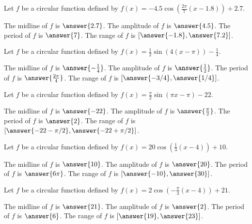 \documentclass{ximera}
\author{Kenneth Berglund}
\begin{document}
\begin{exercise}
Let $f$ be a circular function defined by $f(x) = -4.5 \cos\left(\frac{2\pi}{7}(x - 1.8)\right) + 2.7$.

The midline of $f$ is $\answer{2.7}$. The amplitude of $f$ is $\answer{4.5}$. The period of $f$ is $\answer{7}$. The range of $f$ is $[\answer{-1.8}, \answer{7.2}]$.
\end{exercise} 

\begin{exercise}
Let $f$ be a circular function defined by $f(x) = \frac{1}{2}\sin\left(4(x - \pi)\right) - \frac{1}{4}$.

The midline of $f$ is $\answer{-\frac{1}{4}}$. The amplitude of $f$ is $\answer{\frac{1}{2}}$. The period of $f$ is $\answer{\frac{2\pi}{4}}$. The range of $f$ is $[\answer{-3/4}, \answer{1/4}]$.
\end{exercise} 

\begin{exercise}
Let $f$ be a circular function defined by $f(x) = \frac{\pi}{2}\sin\left(\pi x - \pi\right) - 22$.

The midline of $f$ is $\answer{-22}$. The amplitude of $f$ is $\answer{\frac{\pi}{2}}$. The period of $f$ is $\answer{2}$. The range of $f$ is $[\answer{-22-\pi/2}, \answer{-22+\pi/2}]$.
\end{exercise} 

\begin{exercise}
Let $f$ be a circular function defined by $f(x) = 20\cos\left(\frac{1}{3}( x - 4)\right) + 10$.

The midline of $f$ is $\answer{10}$. The amplitude of $f$ is $\answer{20}$. The period of $f$ is $\answer{6\pi}$. The range of $f$ is $[\answer{-10}, \answer{30}]$.
\end{exercise} 

\begin{exercise}
Let $f$ be a circular function defined by $f(x) = 2\cos\left(-\frac{\pi}{3}( x - 4)\right) + 21$.

The midline of $f$ is $\answer{21}$. The amplitude of $f$ is $\answer{2}$. The period of $f$ is $\answer{6}$. The range of $f$ is $[\answer{19}, \answer{23}]$.
\end{exercise} 
\end{document}
